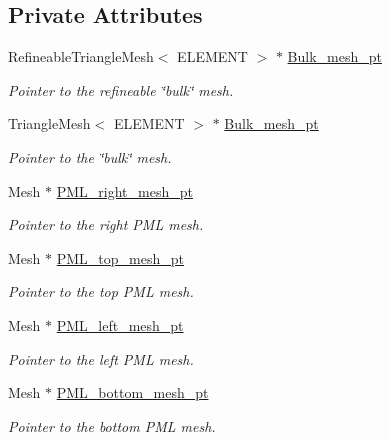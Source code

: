 \subsection*{Private Attributes}
\begin{DoxyCompactItemize}
\item 
Refineable\+Triangle\+Mesh$<$ E\+L\+E\+M\+E\+NT $>$ $\ast$ \hyperlink{classPMLProblem_ac8e72d9422ee75522ee98e617dd7e8ae}{Bulk\+\_\+mesh\+\_\+pt}
\begin{DoxyCompactList}\small\item\em Pointer to the refineable \char`\"{}bulk\char`\"{} mesh. \end{DoxyCompactList}\item 
Triangle\+Mesh$<$ E\+L\+E\+M\+E\+NT $>$ $\ast$ \hyperlink{classPMLProblem_a712cffd454213a1eca6d98bd2f0f7e4e}{Bulk\+\_\+mesh\+\_\+pt}
\begin{DoxyCompactList}\small\item\em Pointer to the \char`\"{}bulk\char`\"{} mesh. \end{DoxyCompactList}\item 
Mesh $\ast$ \hyperlink{classPMLProblem_aa325b694fc238fa65549ba5fca9c47ac}{P\+M\+L\+\_\+right\+\_\+mesh\+\_\+pt}
\begin{DoxyCompactList}\small\item\em Pointer to the right P\+ML mesh. \end{DoxyCompactList}\item 
Mesh $\ast$ \hyperlink{classPMLProblem_a94637421e2738f3b6513861a659914e1}{P\+M\+L\+\_\+top\+\_\+mesh\+\_\+pt}
\begin{DoxyCompactList}\small\item\em Pointer to the top P\+ML mesh. \end{DoxyCompactList}\item 
Mesh $\ast$ \hyperlink{classPMLProblem_ab7376c789c76f1150ebbbdf253969136}{P\+M\+L\+\_\+left\+\_\+mesh\+\_\+pt}
\begin{DoxyCompactList}\small\item\em Pointer to the left P\+ML mesh. \end{DoxyCompactList}\item 
Mesh $\ast$ \hyperlink{classPMLProblem_a524a93acb25ace1f12bd1bb4a23d91e3}{P\+M\+L\+\_\+bottom\+\_\+mesh\+\_\+pt}
\begin{DoxyCompactList}\small\item\em Pointer to the bottom P\+ML mesh. \end{DoxyCompactList}\item 

\end{DoxyCompactItemize}
